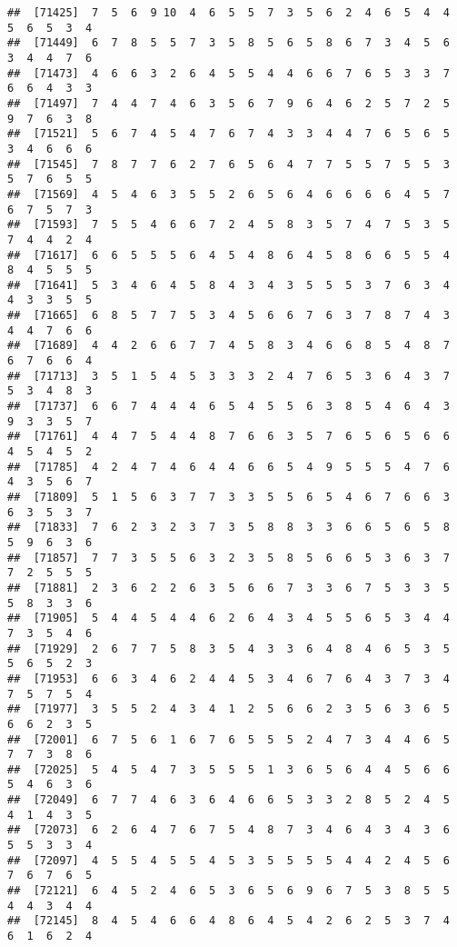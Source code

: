 \documentclass[
]{book}
\begin{document}
\begin{verbatim}
##  [71425]  7  5  6  9 10  4  6  5  5  7  3  5  6  2  4  6  5  4  4  5  6  5  3  4
##  [71449]  6  7  8  5  5  7  3  5  8  5  6  5  8  6  7  3  4  5  6  3  4  4  7  6
##  [71473]  4  6  6  3  2  6  4  5  5  4  4  6  6  7  6  5  3  3  7  6  6  4  3  3
##  [71497]  7  4  4  7  4  6  3  5  6  7  9  6  4  6  2  5  7  2  5  9  7  6  3  8
##  [71521]  5  6  7  4  5  4  7  6  7  4  3  3  4  4  7  6  5  6  5  3  4  6  6  6
##  [71545]  7  8  7  7  6  2  7  6  5  6  4  7  7  5  5  7  5  5  3  5  7  6  5  5
##  [71569]  4  5  4  6  3  5  5  2  6  5  6  4  6  6  6  6  4  5  7  6  7  5  7  3
##  [71593]  7  5  5  4  6  6  7  2  4  5  8  3  5  7  4  7  5  3  5  7  4  4  2  4
##  [71617]  6  6  5  5  5  6  4  5  4  8  6  4  5  8  6  6  5  5  4  8  4  5  5  5
##  [71641]  5  3  4  6  4  5  8  4  3  4  3  5  5  5  3  7  6  3  4  4  3  3  5  5
##  [71665]  6  8  5  7  7  5  3  4  5  6  6  7  6  3  7  8  7  4  3  4  4  7  6  6
##  [71689]  4  4  2  6  6  7  7  4  5  8  3  4  6  6  8  5  4  8  7  6  7  6  6  4
##  [71713]  3  5  1  5  4  5  3  3  3  2  4  7  6  5  3  6  4  3  7  5  3  4  8  3
##  [71737]  6  6  7  4  4  4  6  5  4  5  5  6  3  8  5  4  6  4  3  9  3  3  5  7
##  [71761]  4  4  7  5  4  4  8  7  6  6  3  5  7  6  5  6  5  6  6  4  5  4  5  2
##  [71785]  4  2  4  7  4  6  4  4  6  6  5  4  9  5  5  5  4  7  6  4  3  5  6  7
##  [71809]  5  1  5  6  3  7  7  3  3  5  5  6  5  4  6  7  6  6  3  6  3  5  3  7
##  [71833]  7  6  2  3  2  3  7  3  5  8  8  3  3  6  6  5  6  5  8  5  9  6  3  6
##  [71857]  7  7  3  5  5  6  3  2  3  5  8  5  6  6  5  3  6  3  7  7  2  5  5  5
##  [71881]  2  3  6  2  2  6  3  5  6  6  7  3  3  6  7  5  3  3  5  5  8  3  3  6
##  [71905]  5  4  4  5  4  4  6  2  6  4  3  4  5  5  6  5  3  4  4  7  3  5  4  6
##  [71929]  2  6  7  7  5  8  3  5  4  3  3  6  4  8  4  6  5  3  5  5  6  5  2  3
##  [71953]  6  6  3  4  6  2  4  4  5  3  4  6  7  6  4  3  7  3  4  7  5  7  5  4
##  [71977]  3  5  5  2  4  3  4  1  2  5  6  6  2  3  5  6  3  6  5  6  6  2  3  5
##  [72001]  6  7  5  6  1  6  7  6  5  5  5  2  4  7  3  4  4  6  5  7  7  3  8  6
##  [72025]  5  4  5  4  7  3  5  5  5  1  3  6  5  6  4  4  5  6  6  5  4  6  3  6
##  [72049]  6  7  7  4  6  3  6  4  6  6  5  3  3  2  8  5  2  4  5  4  1  4  3  5
##  [72073]  6  2  6  4  7  6  7  5  4  8  7  3  4  6  4  3  4  3  6  5  5  3  3  4
##  [72097]  4  5  5  4  5  5  4  5  3  5  5  5  5  4  4  2  4  5  6  7  6  7  6  5
##  [72121]  6  4  5  2  4  6  5  3  6  5  6  9  6  7  5  3  8  5  5  4  4  3  4  4
##  [72145]  8  4  5  4  6  6  4  8  6  4  5  4  2  6  2  5  3  7  4  6  1  6  2  4

\end{verbatim}
\end{document}
